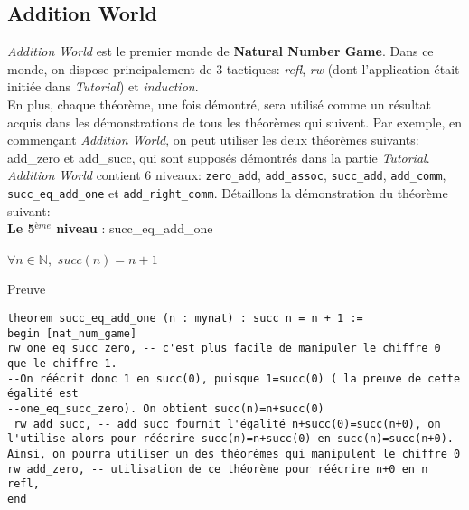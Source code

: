 \subsection{Addition World}
\textit{Addition World} est le premier monde de \textbf{Natural Number Game}. Dans ce monde, on dispose principalement de 3 tactiques: \textit{refl}, \textit{rw} (dont l'application était initiée dans \textit{Tutorial}) et \textit{induction}.\\
En plus, chaque théorème, une fois démontré, sera utilisé comme un résultat acquis dans les démonstrations de tous les théorèmes qui suivent. Par exemple, en commençant \textit{Addition World}, on peut utiliser les deux théorèmes suivants: add\_zero et add\_succ, qui sont supposés démontrés dans la partie \textit{Tutorial}.
\textit{Addition World} contient 6 niveaux: \texttt{zero\_add}, \texttt{add\_assoc}, \texttt{succ\_add}, \texttt{add\_comm}, \texttt{succ\_eq\_add\_one} et \texttt{add\_right\_comm}.
Détaillons la démonstration du théorème suivant:\\
\textbf{Le 5$^{ème}$ niveau} : succ\_eq\_add\_one \begin{center}   $\forall n \in \mathbb{N},$  $succ(n)=n+1$ \end{center}
Preuve
\begin{verbatim}
theorem succ_eq_add_one (n : mynat) : succ n = n + 1 :=
begin [nat_num_game]
rw one_eq_succ_zero, -- c'est plus facile de manipuler le chiffre 0 que le chiffre 1. 
--On réécrit donc 1 en succ(0), puisque 1=succ(0) ( la preuve de cette égalité est
--one_eq_succ_zero). On obtient succ(n)=n+succ(0)
 rw add_succ, -- add_succ fournit l'égalité n+succ(0)=succ(n+0), on l'utilise alors pour réécrire succ(n)=n+succ(0) en succ(n)=succ(n+0). Ainsi, on pourra utiliser un des théorèmes qui manipulent le chiffre 0
rw add_zero, -- utilisation de ce théorème pour réécrire n+0 en n
refl,
end
\end{verbatim}
